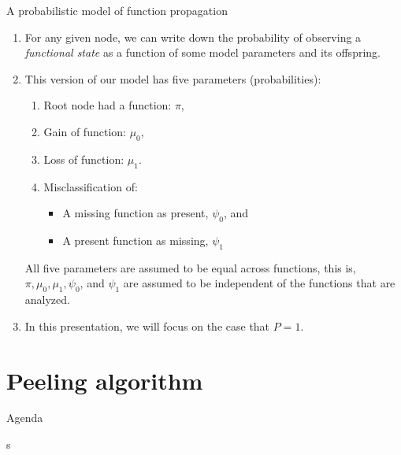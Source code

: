 \documentclass[9pt,ignorenonframetext,]{beamer}
\providecommand{\tightlist}{%
  \setlength{\itemsep}{0pt}\setlength{\parskip}{0pt}}
\begin{document}
\begin{frame}{A probabilistic model of function propagation}

\begin{enumerate}
\def\labelenumi{\arabic{enumi}.}
\item
  For any given node, we can write down the probability of observing a
  \emph{functional state} as a function of some model parameters and its
  offspring. \pause
\item
  This version of our model has five parameters (probabilities): \pause

  \begin{enumerate}
  \def\labelenumii{\alph{enumii}.}
  \tightlist
  \item
    Root node had a function: \(\pi\),
  \item
    Gain of function: \(\mu_0\),
  \item
    Loss of function: \(\mu_1\).
  \item
    Misclassification of:

    \begin{itemize}
    \tightlist
    \item
      A missing function as present, \(\psi_0\), and
    \item
      A present function as missing, \(\psi_1\) \pause
    \end{itemize}
  \end{enumerate}

  All five parameters are assumed to be equal across functions, this is,
  \(\pi, \mu_0, \mu_1, \psi_0\), and \(\psi_1\) are assumed to be
  independent of the functions that are analyzed.\pause
\item
  In this presentation, we will focus on the case that \(P = 1\).
\end{enumerate}

\end{frame}

\section{Peeling algorithm}\label{peeling-algorithm}

\begin{frame}[t]{Agenda}

\tableofcontents[currentsection]s

\end{frame}
\end{document}
